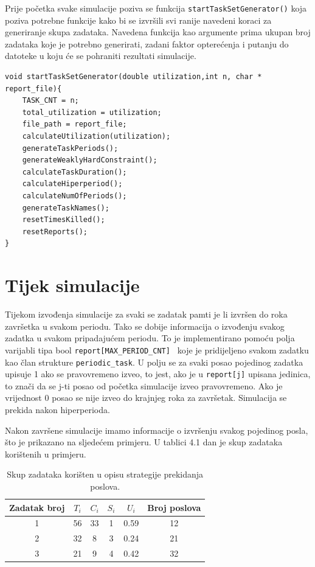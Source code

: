 \documentclass[../zavrsni.tex]{subfiles}
\begin{document}
Prije početka svake simulacije poziva se funkcija \texttt{startTaskSetGenerator()} koja poziva potrebne funkcije kako bi se izvršili 
svi ranije navedeni koraci za generiranje skupa zadataka. Navedena funkcija kao argumente prima ukupan broj zadataka koje je potrebno generirati, zadani 
faktor opterećenja i putanju do datoteke u koju će se pohraniti rezultati simulacije.
\begin{lstlisting}[style=CStyle,caption={Funckija startTaskSetGenerator},captionpos=b]
void startTaskSetGenerator(double utilization,int n, char * report_file){
    TASK_CNT = n; 
    total_utilization = utilization; 
    file_path = report_file;
    calculateUtilization(utilization);
    generateTaskPeriods();
    generateWeaklyHardConstraint();
    calculateTaskDuration();
    calculateHiperperiod();
    calculateNumOfPeriods();
    generateTaskNames();
    resetTimesKilled();
    resetReports();
}
\end{lstlisting}
\section{Tijek simulacije}

Tijekom izvođenja simulacije za svaki se zadatak pamti je li izvršen do roka završetka u svakom periodu. 
Tako se dobije informacija o izvođenju svakog zadatka u svakom pripadajućem periodu. To je implementirano 
pomoću polja varijabli tipa bool \texttt{report[MAX\_PERIOD\_CNT] } koje je pridijeljeno svakom zadatku kao član strukture \texttt{periodic\_task}.
U polju se za svaki posao pojedinog zadatka upisuje 1 ako se pravovremeno izveo, to jest, ako je u \texttt{report[j]} upisana jedinica, to znači da se 
j-ti posao od početka simulacije izveo pravovremeno. Ako je vrijednost 0 posao se nije izveo do krajnjeg roka za završetak.
Simulacija se prekida nakon hiperperioda.

Nakon završene simulacije imamo informacije o izvršenju svakog pojedinog posla, što je prikazano na sljedećem primjeru. U tablici 4.1 dan je 
skup zadataka korištenih u primjeru.

\begin{table}[h!]
    \begin{center}
      \begin{tabular}{||c || c c c c c||} 
       \hline
       Zadatak broj & $T_i$ & $C_i$ & $S_i$ & $U_i$ & Broj poslova \\ [0.5ex] 
       \hline\hline
       1 & 56 & 33 & 1 & 0.59 & 12 \\ 
       \hline
       2 & 32 & 8 & 3 & 0.24 & 21 \\
       \hline
       3 & 21 & 9 & 4 & 0.42 & 32 \\
       \hline
      \end{tabular}
    \end{center}
    \caption{\label{tab:table-name}Skup zadataka korišten u opisu strategije prekidanja poslova.}
    \end{table}
\end{document}
